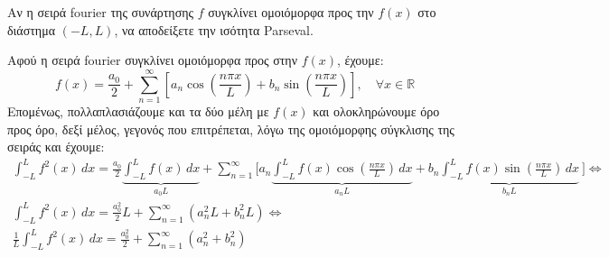 \documentclass[a4paper,table]{report}
\begin{document}
\begin{mybox3}
\begin{example}
  Αν η σειρά fourier της συνάρτησης $f$ συγκλίνει ομοιόμορφα προς την $f(x)$ στο 
  διάστημα $ (-L,L) $, να αποδείξετε την ισότητα \textlatin{Parseval}.
\end{example}
\end{mybox3}
\begin{solution}
  Αφού η σειρά fourier συγκλίνει ομοιόμορφα προς στην $ f(x) $, έχουμε:
  \[
    f(x) = \frac{a_{0}}{2} + \sum_{n=1}^{\infty} \left[a_{n} 
    \cos{\left(\frac{n \pi x}{L}\right)} + b_{n} \sin{\left(\frac{n \pi x}{L}\right)}\right], 
    \quad \forall x \in \mathbb{R} 
  \] 
  Επομένως, πολλαπλασιάζουμε και τα δύο μέλη με $ f(x) $ και ολοκληρώνουμε όρο 
  προς όρο, δεξί μέλος, γεγονός που επιτρέπεται, λόγω της ομοιόμορφης σύγκλισης της 
  σειράς και έχουμε:
  \begin{gather*}
    \int _{-L}^{L} f^{2}(x) \,{dx} 
    = \frac{a_{0}}{2} \underbrace{\int _{-L}^{L} f(x) \,{dx}}_{a_{0}L} + 
    \sum_{n=1}^{\infty} \Biggl[a_{n} \underbrace{\int _{-L}^{L} f(x) 
      \cos{\left(\frac{n \pi x}{L}\right)} \,{dx}}_{a_{n}L} + b_{n} 
      \underbrace{\int _{-L}^{L} f(x) \sin{\left(\frac{n \pi x}{L}\right)} 
    \,{dx}}_{b_{n}L} \ \Biggr] \Leftrightarrow \\ 
    \int _{-L}^{L} f^{2}(x) \,{dx}  = \frac{a_{0}^{2}}{2} L + 
    \sum_{n=1}^{\infty} (a_{n}^{2}L+b_{n}^{2}L) \Leftrightarrow \\
    \frac{1}{L} \int _{-L}^{L} f^{2}(x) \,{dx}  = \frac{a_{0}^{2}}{2}
    + \sum_{n=1}^{\infty} (a_{n}^{2}+b_{n}^{2}) \\
  \end{gather*}
\end{solution}

\enlargethispage*{\baselineskip}
\end{document}
